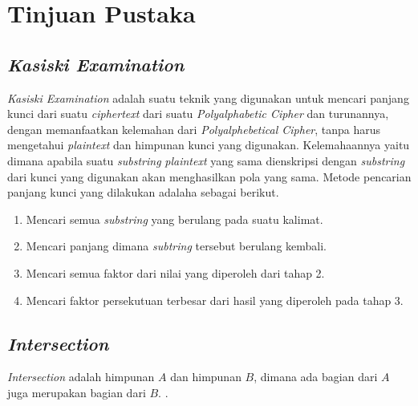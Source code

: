 
\section{Tinjuan Pustaka}

\subsection{\textit{Kasiski Examination}}
\textit{Kasiski Examination} adalah suatu teknik yang digunakan untuk mencari panjang kunci dari suatu \textit{ciphertext} dari suatu \textit{Polyalphabetic Cipher} dan turunannya, dengan memanfaatkan kelemahan dari \textit{Polyalphebetical Cipher}, tanpa harus mengetahui \textit{plaintext} dan himpunan kunci yang digunakan. Kelemahaannya yaitu dimana apabila suatu \textit{substring} \textit{plaintext} yang sama dienskripsi dengan \textit{substring} dari kunci yang digunakan akan menghasilkan pola yang sama\cite{noauthor_kasiski_nodate}. Metode pencarian panjang kunci yang dilakukan adalaha sebagai berikut.
\begin{enumerate}
\item Mencari semua \textit{substring} yang berulang pada suatu kalimat.
\item Mencari panjang dimana \textit{subtring} tersebut berulang kembali.
\item Mencari semua faktor dari nilai yang diperoleh dari tahap 2.
\item Mencari faktor persekutuan terbesar dari hasil yang diperoleh pada tahap 3.
\end{enumerate}


\subsection{\textit{Intersection}}
\textit{Intersection} adalah himpunan $A$ dan himpunan $B$, dimana ada bagian dari $A$ juga merupakan bagian dari $B$. \cite{devlin_joy_1993}.

